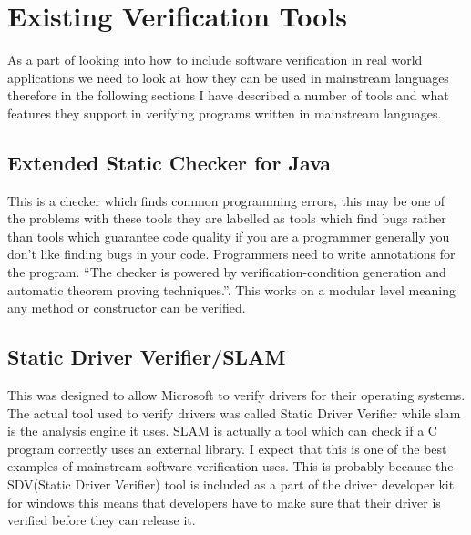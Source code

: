 \documentclass[a4paper,12pt]{scrartcl}
\begin{document}
	\section{Existing Verification Tools}
	{
		As a part of looking into how to include software verification in real world applications we need to look at how they can be used in mainstream languages therefore in the following sections I have described a number of tools and what features they support in verifying programs written in mainstream languages.
		\subsection{Extended Static Checker for Java\cite{Flanagan2002}}
		{
			This is a checker which finds common programming errors, this may be one of the problems with these tools they are labelled as tools which find bugs rather than tools which guarantee code quality if you are a programmer generally you don't like finding bugs in your code. Programmers need to write annotations for the program. \enquote{The checker is powered by verification-condition generation and automatic theorem proving techniques.}\cite{Flanagan2002}. This works on a modular level meaning any method or constructor can be verified.
		}
		\subsection{Static Driver Verifier/SLAM\cite{Ball2004}}
		{
			This was designed to allow Microsoft to verify drivers for their operating systems. The actual tool used to verify drivers was called Static Driver Verifier while slam is the analysis engine it uses. SLAM is actually a tool which can check if a C program correctly uses an external library. I expect that this is one of the best examples of mainstream software verification uses. This is probably because the SDV(Static Driver Verifier) tool is included as a part of the driver developer kit for windows this means that developers have to make sure that their driver is verified before they can release it.
		}
}
\end{document}

